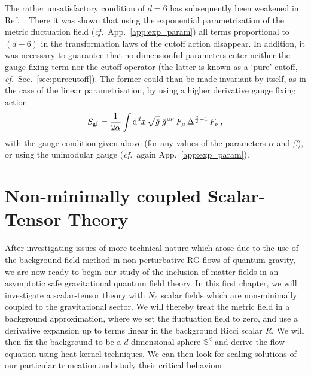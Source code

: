 \documentclass[11pt]{book}
\newcommand{\overbar}[1]{\mkern 1.5mu\overline{\mkern-1.5mu#1\mkern-1.5mu}\mkern 1.5mu}
\newcommand\NS{ N_{\scriptscriptstyle{\mathrm{S}}} }
\newcommand\cf{\textit{cf.}\ }
\numberwithin{equation}{chapter}
\begin{document}
The rather unsatisfactory condition of $d=6$ has subsequently been weakened in
Ref.~\cite{Percacci:2016arh}. There it was shown that using the exponential
parametrisation of the metric fluctuation field (\cf App.~\ref{app:exp_param})
all terms proportional to $(d-6)$ in the transformation laws of the cutoff action
disappear. In addition, it was necessary to guarantee that no dimensionful
parameters enter neither the gauge fixing term nor the cutoff operator
(the latter is known as a `pure' cutoff, \cf Sec.~\ref{sec:purecutoff}).
The former could than
be made invariant by itself, as in the case of the linear parametrisation,
by using a higher derivative gauge fixing action
\begin{align}
  S_\mathrm{gf} = \frac{1}{2\alpha} \int \mathrm d^dx \, \sqrt{\bar g} \;
  \bar g^{\mu\nu} \, F_\mu \, \overbar \Delta^{\frac d2 - 1} \, F_\nu \,,
\end{align}
with the gauge condition given above (for any values of the parameters
$\alpha$ and $\beta$), or using the unimodular gauge (\cf again
App.~\ref{app:exp_param}).




\chapter{Non-minimally coupled Scalar-Tensor Theory}
\label{ch:scalartensor}

After investigating issues of more technical nature which arose due to
the use of the background field method in non-perturbative RG flows
of quantum gravity, we are now ready to begin our study of the inclusion of
matter fields in an asymptotic safe gravitational quantum field theory.
In this first chapter, we will investigate a scalar-tensor theory
with $\NS$ scalar fields which are non-minimally coupled to the
gravitational sector. We will thereby treat the metric field in a background
approximation, where we set the fluctuation field to zero, and use
a derivative expansion up to terms linear in the background Ricci
scalar $\bar R$. We will then fix the background to be a $d$-dimensional
sphere $\mathbb S^d$ and derive the flow equation using heat kernel
techniques. We can then look for scaling solutions of our particular truncation
and study their critical behaviour.
\end{document}
